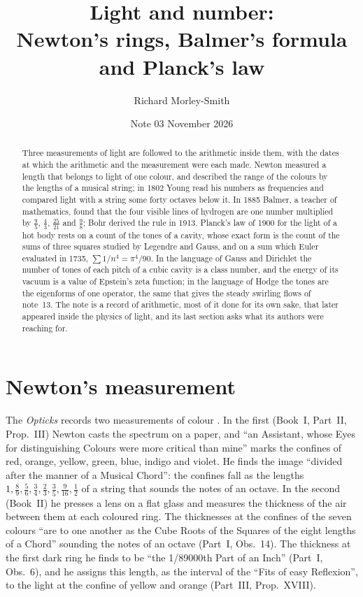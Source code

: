 \documentclass[11pt]{article}
\title{Light and number:\\ Newton's rings, Balmer's formula and Planck's law}
\author{Richard Morley-Smith}
\date{Note 03 \quad November 2026}
\begin{document}
\maketitle

\begin{abstract}
\noindent
Three measurements of light are followed to the arithmetic inside them, with the dates at which the arithmetic and the measurement were each made.
Newton measured a length that belongs to light of one colour, and described the range of the colours by the lengths of a musical string; in 1802 Young read his numbers as frequencies and compared light with a string some forty octaves below it.
In 1885 Balmer, a teacher of mathematics, found that the four visible lines of hydrogen are one number multiplied by $\tfrac95$, $\tfrac43$, $\tfrac{25}{21}$ and $\tfrac98$; Bohr derived the rule in 1913.
Planck's law of 1900 for the light of a hot body rests on a count of the tones of a cavity, whose exact form is the count of the sums of three squares studied by Legendre and Gauss, and on a sum which Euler evaluated in 1735, $\sum 1/n^4 = \pi^4/90$.
In the language of Gauss and Dirichlet the number of tones of each pitch of a cubic cavity is a class number, and the energy of its vacuum is a value of Epstein's zeta function; in the language of Hodge the tones are the eigenforms of one operator, the same that gives the steady swirling flows of note~13.
The note is a record of arithmetic, most of it done for its own sake, that later appeared inside the physics of light, and its last section asks what its authors were reaching for.
\end{abstract}

\section{Newton's measurement}

The \emph{Opticks} records two measurements of colour \cite{Opticks}.
In the first (Book~I, Part~II, Prop.~III) Newton casts the spectrum on a paper, and ``an Assistant, whose Eyes for distinguishing Colours were more critical than mine'' marks the confines of red, orange, yellow, green, blue, indigo and violet.
He finds the image ``divided after the manner of a Musical Chord'': the confines fall as the lengths $1, \tfrac89, \tfrac56, \tfrac34, \tfrac23, \tfrac35, \tfrac9{16}, \tfrac12$ of a string that sounds the notes of an octave.
In the second (Book~II) he presses a lens on a flat glass and measures the thickness of the air between them at each coloured ring.
The thicknesses at the confines of the seven colours ``are to one another as the Cube Roots of the Squares of the eight lengths of a Chord'' sounding the notes of an octave (Part~I, Obs.~14).
The thickness at the first dark ring he finds to be ``the 1/89000th Part of an Inch'' (Part~I, Obs.~6), and he assigns this length, as the interval of the ``Fits of easy Reflexion'', to the light at the confine of yellow and orange (Part~III, Prop.~XVIII).
\end{document}
